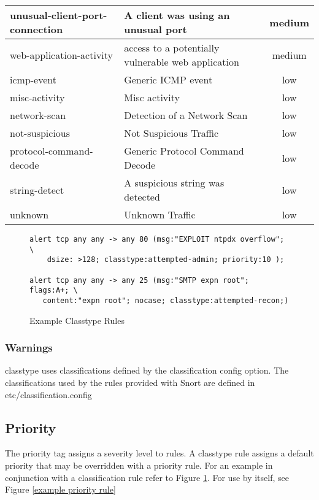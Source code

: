 \documentclass[english]{report}
\begin{document}
\begin{center}
\begin{longtable}{|p{2in}|p{2.5in}|c|}
\hline 
unusual-client-port-connection&
A client was using an unusual port & medium\\
\hline 
web-application-activity&
access to a potentially vulnerable web application & medium\\
\hline
icmp-event&
Generic ICMP event & low\\
\hline 
misc-activity&
Misc activity & low\\
\hline 
network-scan&
Detection of a Network Scan & low\\
\hline 
not-suspicious&
Not Suspicious Traffic & low\\
\hline 
protocol-command-decode&
Generic Protocol Command Decode & low\\
\hline 
string-detect&
A suspicious string was detected & low\\
\hline 
unknown&
Unknown Traffic & low\\
\hline
\end{longtable}
\end{center}


\begin{figure}[!hbpt]
\begin{verbatim}
alert tcp any any -> any 80 (msg:"EXPLOIT ntpdx overflow"; \ 
    dsize: >128; classtype:attempted-admin; priority:10 );

alert tcp any any -> any 25 (msg:"SMTP expn root"; flags:A+; \
   content:"expn root"; nocase; classtype:attempted-recon;)
\end{verbatim}
\caption{Example Classtype Rules\label{example classification rules}}
\end{figure}

\subsubsection{Warnings}

classtype uses classifications defined by the classification config option.  The classifications used by the rules provided with Snort are defined in etc/classification.config

\subsection{Priority}

The priority tag assigns a severity level to rules. A classtype rule
assigns a default priority that may be overridden with a priority
rule. For an example in conjunction with a classification rule refer
to Figure \ref{example classification rules}. For use by itself,
see Figure \ref{example priority rule}
\end{document}
